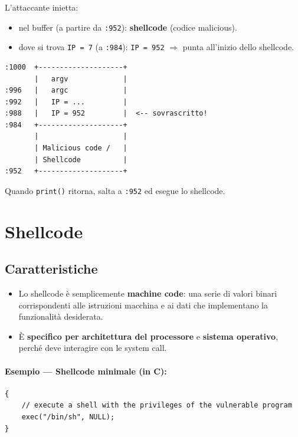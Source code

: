 L'attaccante inietta:
\begin{itemize}
  \item nel buffer (a partire da \texttt{:952}): \textbf{shellcode} (codice malicious).
  \item dove si trova \texttt{IP = 7} (a \texttt{:984}): \texttt{IP = 952} $\Rightarrow$ punta all'inizio dello shellcode.
\end{itemize}

\begin{verbatim}
:1000  +--------------------+
       |   argv             |
:996   |   argc             |
:992   |   IP = ...         |
:988   |   IP = 952         |  <-- sovrascritto!
:984   +--------------------+
       |                    |
       | Malicious code /   |
       | Shellcode          |
:952   +--------------------+
\end{verbatim}

Quando \texttt{print()} ritorna, salta a \texttt{:952} ed esegue lo shellcode.

\section{Shellcode}


\subsection{Caratteristiche}

\begin{itemize}
  \item Lo shellcode \`e semplicemente \textbf{machine code}: una serie di valori binari corrispondenti alle istruzioni macchina e ai dati che implementano la funzionalit\`a desiderata.
  \item \`E \textbf{specifico per architettura del processore} e \textbf{sistema operativo}, perch\'e deve interagire con le system call.
\end{itemize}

\paragraph{Esempio --- Shellcode minimale (in C):}
\begin{verbatim}
{
    // execute a shell with the privileges of the vulnerable program
    exec("/bin/sh", NULL);
}
\end{verbatim}

